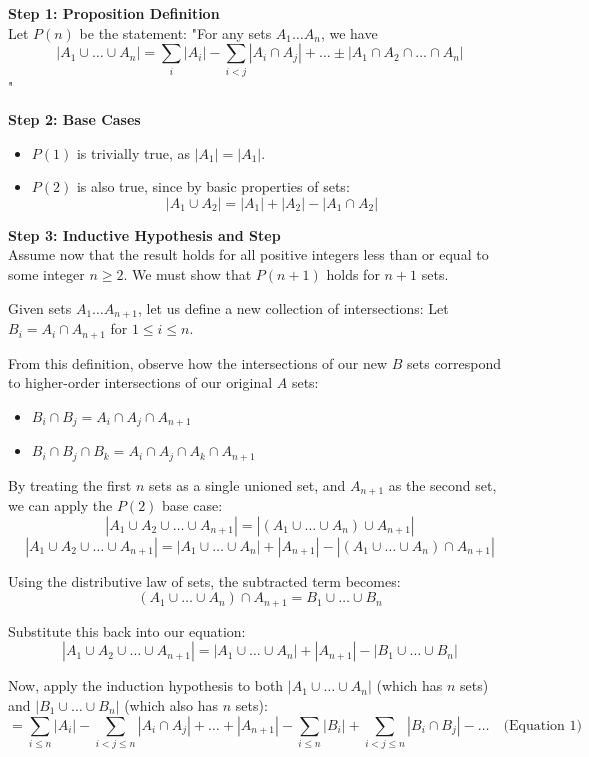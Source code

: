 \documentclass[12pt]{article}
\begin{document}
\textbf{Step 1: Proposition Definition}\\
Let $P(n)$ be the statement: "For any sets $A_1 \dots A_n$, we have
\[
|A_1 \cup \dots \cup A_n| = \sum_{i} |A_i| - \sum_{i<j} |A_i \cap A_j| + \dots \pm |A_1 \cap A_2 \cap \dots \cap A_n|
\]
"

\textbf{Step 2: Base Cases}
\begin{itemize}
    \item $P(1)$ is trivially true, as $|A_1| = |A_1|$.
    \item $P(2)$ is also true, since by basic properties of sets:
\[
|A_1 \cup A_2| = |A_1| + |A_2| - |A_1 \cap A_2|
\]
\end{itemize}

\textbf{Step 3: Inductive Hypothesis and Step}\\
Assume now that the result holds for all positive integers less than or equal to some integer $n \ge 2$. We must show that $P(n+1)$ holds for $n+1$ sets.

Given sets $A_1 \dots A_{n+1}$, let us define a new collection of intersections:
Let $B_i = A_i \cap A_{n+1}$ for $1 \le i \le n$.

From this definition, observe how the intersections of our new $B$ sets correspond to higher-order intersections of our original $A$ sets:
\begin{itemize}
    \item $B_i \cap B_j = A_i \cap A_j \cap A_{n+1}$
    \item $B_i \cap B_j \cap B_k = A_i \cap A_j \cap A_k \cap A_{n+1}$
\end{itemize}

By treating the first $n$ sets as a single unioned set, and $A_{n+1}$ as the second set, we can apply the $P(2)$ base case:
\[
|A_1 \cup A_2 \cup \dots \cup A_{n+1}| = |(A_1 \cup \dots \cup A_n) \cup A_{n+1}|
\]
\[
|A_1 \cup A_2 \cup \dots \cup A_{n+1}| = |A_1 \cup \dots \cup A_n| + |A_{n+1}| - |(A_1 \cup \dots \cup A_n) \cap A_{n+1}|
\]

Using the distributive law of sets, the subtracted term becomes:
\[
(A_1 \cup \dots \cup A_n) \cap A_{n+1} = B_1 \cup \dots \cup B_n
\]

Substitute this back into our equation:
\[
|A_1 \cup A_2 \cup \dots \cup A_{n+1}| = |A_1 \cup \dots \cup A_n| + |A_{n+1}| - |B_1 \cup \dots \cup B_n|
\]

Now, apply the induction hypothesis to both $|A_1 \cup \dots \cup A_n|$ (which has $n$ sets) and $|B_1 \cup \dots \cup B_n|$ (which also has $n$ sets):
\[
= \sum_{i \le n} |A_i| - \sum_{i < j \le n} |A_i \cap A_j| + \dots + |A_{n+1}| - \sum_{i \le n} |B_i| + \sum_{i < j \le n} |B_i \cap B_j| - \dots \quad \text{(Equation 1)}
\]
\end{document}

